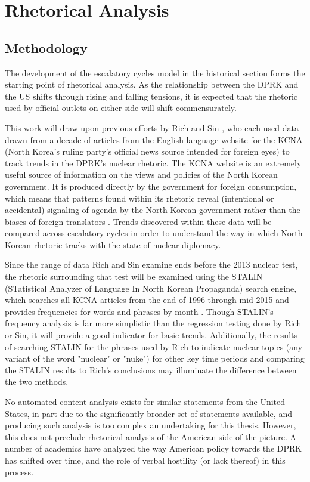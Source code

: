 \documentclass{article}
\begin{document}
\section{Rhetorical Analysis}

\subsection{Methodology}
The development of the escalatory cycles model in the historical section forms the starting point of rhetorical analysis. As the relationship between the DPRK and the US shifts through rising and falling tensions, it is expected that the rhetoric used by official outlets on either side will shift commensurately.

This work will draw upon previous efforts by Rich \cite{rich12, rich14} and Sin \cite{sin}, who each used data drawn from a decade of articles from the English-language website for the KCNA (North Korea's ruling party's official news source intended for foreign eyes) to track trends in the DPRK's nuclear rhetoric. The KCNA website is an extremely useful source of information on the views and policies of the North Korean government. It is produced directly by the government for foreign consumption, which means that patterns found within its rhetoric reveal (intentional or accidental) signaling of agenda by the North Korean government rather than the biases of foreign translators \cite{rich12}. Trends discovered within these data will be compared across escalatory cycles in order to understand the way in which North Korean rhetoric tracks with the state of nuclear diplomacy.

Since the range of data Rich and Sin examine ends before the 2013 nuclear test, the rhetoric surrounding that test will be examined using the STALIN (STatistical Analyzer of Language In North Korean Propaganda) search engine, which searches all KCNA articles from the end of 1996 through mid-2015 and provides frequencies for words and phrases by month \cite{stalin}. Though STALIN's frequency analysis is far more simplistic than the regression testing done by Rich or Sin, it will provide a good indicator for basic trends. Additionally, the results of searching STALIN for the phrases used by Rich to indicate nuclear topics (any variant of the word "nuclear" or "nuke") for other key time periods and comparing the STALIN results to Rich's conclusions may illuminate the difference between the two methods.

No automated content analysis exists for similar statements from the United States, in part due to the significantly broader set of statements available, and producing such analysis is too complex an undertaking for this thesis. However, this does not preclude rhetorical analysis of the American side of the picture. A number of academics have analyzed the way American policy towards the DPRK has shifted over time, and the role of verbal hostility (or lack thereof) in this process.
\end{document}
